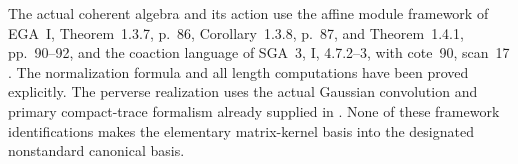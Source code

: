The actual coherent algebra and its action use the
affine module framework of EGA~I, Theorem~1.3.7, p.~86,
Corollary~1.3.8, p.~87, and Theorem~1.4.1, pp.~90--92,
and the coaction language of SGA~3, I, 4.7.2--3,
with cote~90, scan~17 \cite{EGA,SGA3,Archive}.
The normalization formula and all length computations
have been proved explicitly.
The perverse realization uses the actual Gaussian
convolution and primary compact-trace formalism
already supplied in .
None of these framework identifications makes the
elementary matrix-kernel basis into the designated
nonstandard canonical basis.

